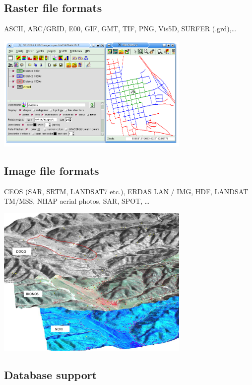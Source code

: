 \documentclass[notumble,a4paper,10pt,nofoldmark]{leaflet}
\newenvironment{myfig}[1][0pt plus 1.5ex minus .5ex]{\par\vspace*{#1}\begin{minipage}{\textwidth}\centering}{\end{minipage}}
\begin{document}
\subsection{Raster file formats}
ASCII, ARC/GRID, E00, GIF, GMT, TIF, PNG, Vis5D, SURFER (.grd),\dots
\begin{myfig}
\includegraphics[width=0.7\textwidth]{isodist}
\end{myfig}

\subsection{Image file formats}

CEOS (SAR, SRTM, LANDSAT7 etc.), ERDAS LAN / IMG, HDF, LANDSAT TM/MSS, NHAP aerial photos, SAR, SPOT, \dots
\begin{myfig}[1.5ex]
\includegraphics[width=0.7\textwidth]{ndvi}
\end{myfig}

\subsection{Database support}
\end{document}
